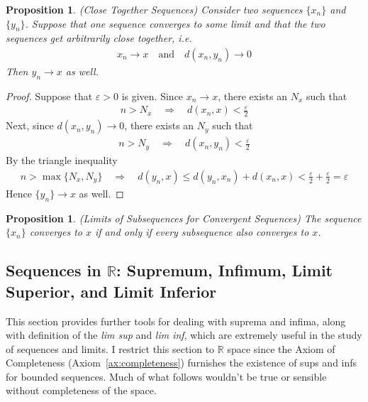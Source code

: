 \documentclass[12pt]{article}
\numberwithin{equation}{section} %
\theoremstyle{plain}
\newtheorem{prop}[thm]{Proposition}
\theoremstyle{definition}
\theoremstyle{remark}
\newcommand{\R}{\mathbb{R}}
\begin{document}
\begin{prop}{\emph{(Close Together Sequences)}}
Consider two sequences $\{x_n\}$ and $\{y_n\}$.
Suppose that one sequence converges to some limit and that the two
sequences get arbitrarily close together, i.e.
\begin{align*}
  x_n\rightarrow x
  \quad\text{and}\quad
  d(x_n,y_n)\rightarrow 0
\end{align*}
Then $y_n\rightarrow x$ as well.
\end{prop}
\begin{proof}
Suppose that $\varepsilon>0$ is given. Since $x_n\rightarrow x$, there
exists an $N_x$ such that
\begin{align*}
  n > N_x
  \quad\Rightarrow\quad
  d(x_n,x) < \frac{\varepsilon}{2}
\end{align*}
Next, since $d(x_n,y_n)\rightarrow 0$, there exists an $N_y$ such that
\begin{align*}
  n > N_y
  \quad\Rightarrow\quad
  d(x_n,y_n) < \frac{\varepsilon}{2}
\end{align*}
By the triangle inequality
\begin{align*}
  n>\max\{N_x,N_y\}
  \quad\Rightarrow\quad
  d(y_n,x) \leq
  d(y_n,x_n) + d(x_n,x)
  < \frac{\varepsilon}{2} + \frac{\varepsilon}{2} = \varepsilon
\end{align*}
Hence $\{y_n\}\rightarrow x$ as well.

\end{proof}

\begin{prop}{\emph{(Limits of Subsequences for Convergent Sequences)}}
\label{prop:subseq}
The sequence $\{x_n\}$ converges to $x$ if and only if every subsequence
also converges to $x$.
\end{prop}


\subsection{Sequences in $\R$: Supremum, Infimum, Limit Superior, and
Limit Inferior}

This section provides further tools for dealing with suprema and infima,
along with definition of the \emph{lim sup} and \emph{lim inf}, which
are extremely useful in the study of sequences and limits.
I restrict this section to $\R$ space since the Axiom of Completeness
(Axiom~\ref{ax:completeness}) furnishes the existence of sups and infs
for bounded sequences. Much of what follows wouldn't be true or sensible
without completeness of the space.
\end{document}

